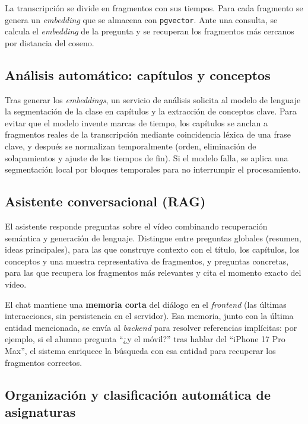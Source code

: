 La transcripción se divide en fragmentos con sus tiempos. Para cada fragmento se genera un
\textit{embedding} que se almacena con \texttt{pgvector}. Ante una consulta, se calcula el
\textit{embedding} de la pregunta y se recuperan los fragmentos más cercanos por distancia del
coseno.

\subsection{Análisis automático: capítulos y conceptos}

Tras generar los \textit{embeddings}, un servicio de análisis solicita al modelo de lenguaje la
segmentación de la clase en capítulos y la extracción de conceptos clave. Para evitar que el
modelo invente marcas de tiempo, los capítulos se anclan a fragmentos reales de la transcripción
mediante coincidencia léxica de una frase clave, y después se normalizan temporalmente (orden,
eliminación de solapamientos y ajuste de los tiempos de fin). Si el modelo falla, se aplica una
segmentación local por bloques temporales para no interrumpir el procesamiento.

\subsection{Asistente conversacional (RAG)}

El asistente responde preguntas sobre el vídeo combinando recuperación semántica y generación de
lenguaje. Distingue entre preguntas globales (resumen, ideas principales), para las que construye
contexto con el título, los capítulos, los conceptos y una muestra representativa de fragmentos,
y preguntas concretas, para las que recupera los fragmentos más relevantes y cita el momento
exacto del vídeo.

El chat mantiene una \textbf{memoria corta} del diálogo en el \textit{frontend} (las últimas
interacciones, sin persistencia en el servidor). Esa memoria, junto con la última entidad
mencionada, se envía al \textit{backend} para resolver referencias implícitas: por ejemplo, si el
alumno pregunta ``¿y el móvil?'' tras hablar del ``iPhone 17 Pro Max'', el sistema enriquece la
búsqueda con esa entidad para recuperar los fragmentos correctos.

\subsection{Organización y clasificación automática de asignaturas}

